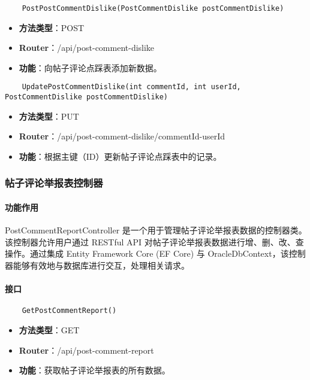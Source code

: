 \begin{verbatim}
	PostPostCommentDislike(PostCommentDislike postCommentDislike)
\end{verbatim}

\begin{itemize}
	\item \textbf{方法类型}：POST
	\item \textbf{Router}：/api/post-comment-dislike
	\item \textbf{功能}：向帖子评论点踩表添加新数据。
\end{itemize}

\begin{verbatim}
	UpdatePostCommentDislike(int commentId, int userId, PostCommentDislike postCommentDislike)
\end{verbatim}

\begin{itemize}
	\item \textbf{方法类型}：PUT
	\item \textbf{Router}：/api/post-comment-dislike/{commentId}-{userId}
	\item \textbf{功能}：根据主键（ID）更新帖子评论点踩表中的记录。
\end{itemize}

\subsubsection{帖子评论举报表控制器}

\paragraph{功能作用}

PostCommentReportController 是一个用于管理帖子评论举报表数据的控制器类。该控制器允许用户通过 RESTful API 对帖子评论举报表数据进行增、删、改、查操作。通过集成 Entity Framework Core (EF Core) 与 OracleDbContext，该控制器能够有效地与数据库进行交互，处理相关请求。

\paragraph{接口}

\begin{verbatim}
	GetPostCommentReport()
\end{verbatim}

\begin{itemize}
	\item \textbf{方法类型}：GET
	\item \textbf{Router}：/api/post-comment-report
	\item \textbf{功能}：获取帖子评论举报表的所有数据。
\end{itemize}

